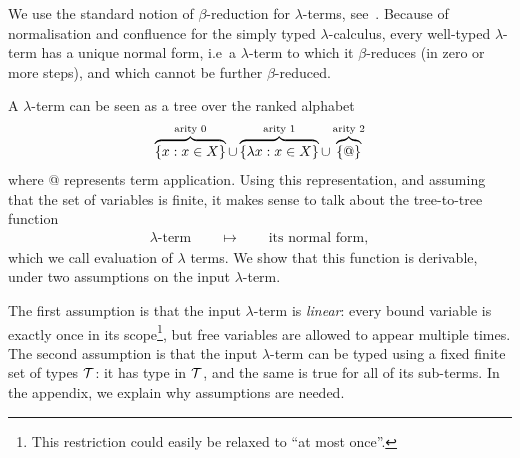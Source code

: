 We use the standard notion of $\beta$-reduction for $\lambda$-terms, see~\cite[Definition 1.2.1]{sorensen_lectures_2006}.  
Because of normalisation and confluence for the simply typed $\lambda$-calculus, every well-typed $\lambda$-term has a unique normal form, i.e~a $\lambda$-term to which it $\beta$-reduces (in zero or more steps), and which cannot be further $\beta$-reduced.

A $\lambda$-term  can be seen as a tree over the ranked alphabet
\begin{align}
    \label{eq:alphabet-for-lambda-terms}
  \overbrace{\{x : x \in X\}}^{\text{arity 0}} \cup \overbrace{\{\lambda x : x \in X\}}^{\text{arity 1}} \cup  \overbrace{\{@\}}^{\text{arity 2}}
\end{align}
where @ represents term application. Using this representation, and assuming that the set of variables is finite, it makes sense to talk about the tree-to-tree function
\begin{align*}
\text{$\lambda$-term} \qquad \mapsto \qquad \text{its normal form},
\end{align*}
which we call evaluation of $\lambda$ terms. 
 We show that this function is derivable, under two assumptions on the input $\lambda$-term. 
 
 The first assumption is that the input $\lambda$-term is \emph{linear}: 
    every bound variable is exactly once in its scope\footnote{This restriction could easily be relaxed to ``at most once''.}, but free variables are allowed to appear multiple times.  
     The second assumption is that  the input $\lambda$-term can be typed using a fixed finite set of types ${\mathcal T}$: it has type in ${\mathcal T}$, and the same is true for all of its  sub-terms.  In the appendix, we explain why  assumptions are needed.




